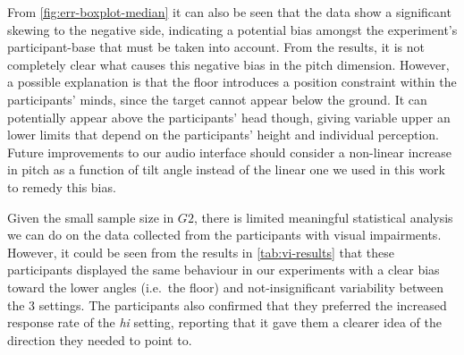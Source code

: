 \documentclass[sigconf, screen=true, anonymous=true]{acmart}
\begin{document}
From \cref{fig:err-boxplot-median} it can also be seen that the data show a significant skewing to the negative side, indicating a potential bias amongst the experiment's participant-base that must be taken into account.
From the results, it is not completely clear what causes this negative bias in the pitch dimension.
However, a possible explanation is that the floor introduces a position constraint within the participants' minds, since the target cannot appear below the ground.
It can potentially appear above the participants' head though, giving variable upper an lower limits that depend on the participants' height and individual perception.
Future improvements to our audio interface should consider a non-linear increase in pitch as a function of tilt angle instead of the linear one we used in this work to remedy this bias.


Given the small sample size in $G2$, there is limited meaningful statistical analysis we can do on the data collected from the participants with visual impairments.
However, it could be seen from the results in \cref{tab:vi-results} that these participants displayed the same behaviour in our experiments with a clear bias toward the lower angles (i.e.\ the floor) and not-insignificant variability between the 3 settings.
The participants also confirmed that they preferred the increased response rate of the \emph{hi} setting, reporting that it gave them a clearer idea of the direction they needed to point to. 
\end{document}
